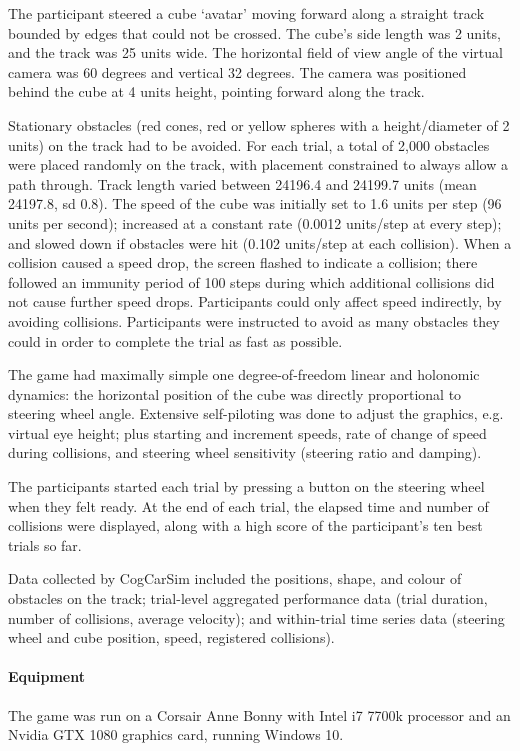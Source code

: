 \documentclass{frontierstyle/frontiersSCNS}
\begin{document}
The participant steered a cube `avatar' moving forward along a straight track bounded by edges that could not be crossed. The cube's side length was 2 units, and the track was 25 units wide.  The horizontal field of view angle of the virtual camera was 60 degrees and vertical 32 degrees. The camera was positioned behind the cube at 4 units height, pointing forward along the track.

Stationary obstacles (red cones, red or yellow spheres with a height/diameter of 2 units) on the track had to be avoided. For each trial, a total of 2,000 obstacles were placed randomly on the track, with placement constrained to always allow a path through. Track length varied between 24196.4 and 24199.7 units (mean 24197.8, sd 0.8). The speed of the cube was initially set to 1.6 units per step (96 units per second); increased at a constant rate (0.0012 units/step at every step); and slowed down if obstacles were hit (0.102 units/step at each collision). When a collision caused a speed drop, the screen flashed to indicate a collision; there followed an immunity period of 100 steps during which additional collisions did not cause further speed drops. Participants could only affect speed indirectly, by avoiding collisions.  Participants were instructed to avoid as many obstacles they could in order to complete the trial as fast as possible.

The game had maximally simple one degree-of-freedom linear and holonomic dynamics: the horizontal position of the cube was directly proportional to steering wheel angle. Extensive self-piloting was done to adjust the graphics, e.g. virtual eye height; plus starting and increment speeds, rate of change of speed during collisions, and steering wheel sensitivity (steering ratio and damping).

The participants started each trial by pressing a button on the steering wheel when they felt ready. At the end of each trial, the elapsed time and number of collisions were displayed, along with a high score of the participant's ten best trials so far.

Data collected by CogCarSim included the positions, shape, and colour of obstacles on the track; trial-level aggregated performance data (trial duration, number of collisions, average velocity); and within-trial time series data (steering wheel and cube position, speed, registered collisions).

\paragraph*{Equipment} The game was run on a Corsair Anne Bonny with Intel i7 7700k processor and an Nvidia GTX 1080 graphics card, running Windows 10.
\end{document}
